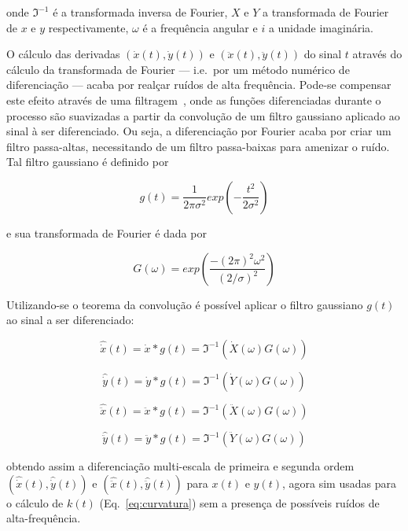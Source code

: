 \noindent onde $\Im^{-1}$ é a transformada inversa de Fourier, $X$ e $Y$ a
transformada de Fourier de $x$ e $y$ respectivamente, $\omega$ é a frequência angular
e $i$ a unidade imaginária.

O cálculo das derivadas $(\dot{x}(t), \dot{y}(t))$ e $(\ddot{x}(t),
\ddot{y}(t))$ do sinal $t$ através do cálculo da transformada de
Fourier --- i.e.\ por um método numérico de diferenciação --- acaba
por realçar ruídos de alta frequência. Pode-se compensar este efeito
através de uma filtragem~\cite{luciano,luciano2010}, onde as funções
diferenciadas durante o processo são suavizadas a partir da convolução
de um filtro gaussiano aplicado ao sinal à ser diferenciado. Ou seja,
a diferenciação por Fourier acaba por criar um filtro passa-altas,
necessitando de um filtro passa-baixas para amenizar o ruído. Tal
filtro gaussiano é definido por

\begin{equation}
g(t) = \frac{1}{2\pi\sigma^2} exp \left( -\frac{t^2}{2\sigma^2}\right)
\end{equation}

\noindent e sua transformada de Fourier é dada por

\begin{equation}
G(\omega) = exp \left( \frac{-(2\pi)^2\omega^2}{(2/\sigma)^2} \right)
\end{equation}

Utilizando-se o teorema da convolução é possível aplicar o filtro
gaussiano $g(t)$ ao sinal a ser diferenciado:

\begin{equation}
\hat{\dot{x}}(t) = \dot{x} \ast g(t) = \Im^{-1}\left( \dot{X}(\omega) G(\omega) \right)
\end{equation}

\begin{equation}
\hat{\dot{y}}(t) = \dot{y} \ast g(t) = \Im^{-1}\left( \dot{Y}(\omega) G(\omega) \right)
\end{equation}

\begin{equation}
\hat{\ddot{x}}(t) = \ddot{x} \ast g(t) = \Im^{-1}\left( \ddot{X}(\omega) G(\omega) \right)
\end{equation}

\begin{equation}
\hat{\ddot{y}}(t) = \ddot{y} \ast g(t) = \Im^{-1}\left( \ddot{Y}(\omega) G(\omega) \right)
\end{equation}

\noindent obtendo assim a diferenciação multi-escala de primeira e
segunda ordem $(\hat{\dot{x}}(t),\hat{\dot{y}}(t))$ e
$(\hat{\ddot{x}}(t),\hat{\ddot{y}}(t))$ para $x(t)$ e $y(t)$, agora
sim usadas para o cálculo de $k(t)$ (Eq.~\ref{eq:curvatura}) sem a
presença de possíveis ruídos de alta-frequência.

